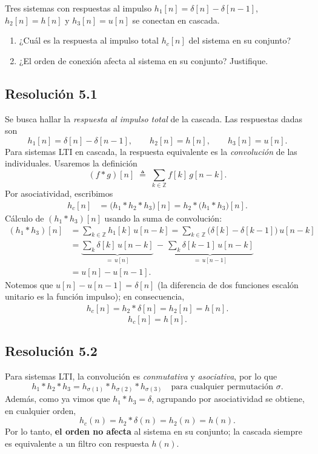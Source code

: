 \documentclass[
  11pt,
  letterpaper,
   addpoints,
  ]{exam}
\begin{document}
\begin{questions}
\question Tres sistemas con respuestas al impulso \(h_1[n]=\delta[n]-\delta[n-1]\), \(h_2[n]=h[n]\) y \(h_3[n]=u[n]\) se conectan en cascada.
\begin{enumerate}
  \item ¿Cuál es la respuesta al impulso total \(h_c[n]\) del sistema en su conjunto?
  \item ¿El orden de conexión afecta al sistema en su conjunto? Justifique.
\end{enumerate}
\begin{solution}
  \subsection*{Resolución 5.1}
  Se busca hallar la \emph{respuesta al impulso total} de la cascada. Las respuestas dadas son
  \[ h_1[n]=\delta[n]-\delta[n-1],\qquad h_2[n]=h[n],\qquad h_3[n]=u[n]. \]
  Para sistemas LTI en cascada, la respuesta equivalente es la \emph{convolución} de las individuales. Usaremos la definición
  \[
    (f*g)[n]\;\triangleq\;\sum_{k\in\mathbb{Z}} f[k] \, g[n-k].
  \]
  Por asociatividad, escribimos
  \begin{align}
    h_c[n] 
    &= \big(h_1*h_2*h_3\big)[n]
     = h_2 * \big(h_1*h_3\big)[n].
  \end{align}
  Cálculo de $(h_1*h_3)[n]$ usando la suma de convolución:
  \begin{align}
    (h_1*h_3)[n]
      &= \sum_{k\in\mathbb{Z}} h_1[k] \, u[n-k]
       = \sum_{k\in\mathbb{Z}} \big(\delta[k]-\delta[k-1]\big) \, u[n-k]\\
      &= \underbrace{\sum_{k} \delta[k] \, u[n-k]}_{=\,u[n]}
       \, - \, \underbrace{\sum_{k} \delta[k-1] \, u[n-k]}_{=\,u[n-1]} \\
      &= u[n]-u[n-1].
  \end{align}
  Notemos que $u[n]-u[n-1]=\delta[n]$ (la diferencia de dos funciones escalón unitario es la función impulso); en consecuencia,
\begin{align}
  h_{c}[n] = h_2 * \delta[n] = h_2[n] = h[n].
\end{align}
  \[
    \boxed{\,h_c[n]=h[n].\,}
  \]


  \subsection*{Resolución 5.2}
Para sistemas LTI, la convolución es \emph{conmutativa} y \emph{asociativa}, por lo que
  \[
    h_1*h_2*h_3 = h_{\sigma(1)}*h_{\sigma(2)}*h_{\sigma(3)}\quad \text{para cualquier permutación }\sigma.
  \]
  Además, como ya vimos que $h_1*h_3=\delta$, agrupando por asociatividad se obtiene, en cualquier orden,
  \[
    h_c(n) = h_2*\delta(n) = h_2(n) = h(n).
  \]
  Por lo tanto, \textbf{el orden no afecta} al sistema en su conjunto; la cascada siempre es equivalente a un filtro con respuesta $h(n)$.
\end{solution}


\end{questions}
\end{document}
